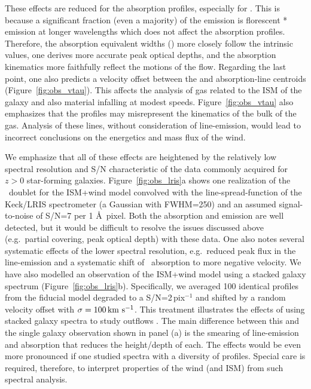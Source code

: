\documentclass[12pt,preprint]{aastex}
\begin{document}
These effects %
are reduced
for the  absorption profiles, especially for \feiia.  This
is because a significant fraction (even a majority) of the
 emission is florescent * emission at longer
wavelengths which does not affect the absorption profiles. 
Therefore, the  absorption equivalent widths (\ewabs) more
closely follow the intrinsic values, one derives more accurate peak
optical depths, and the absorption kinematics more faithfully reflect
the motions of the flow.  Regarding the last point, one also
predicts a velocity offset between the  and 
absorption-line centroids (Figure~\ref{fig:obs_vtau}).
This affects the analysis of gas related to the ISM of the galaxy and
also material infalling at modest speeds.  
Figure~\ref{fig:obs_vtau} also emphasizes that
the  profiles may misrepresent the kinematics of the bulk of
the gas.  Analysis of these lines, without consideration of
line-emission, would lead to incorrect conclusions on the energetics
and mass flux of the wind.

We emphasize that all of these effects are heightened by the
relatively low spectral resolution and S/N characteristic of the data
commonly acquired for $z>0$ star-forming galaxies.  Figure~\ref{fig:obs_lris}a
shows one realization of the \mgiid\ doublet for the ISM+wind model
convolved with the line-spread-function of the Keck/LRIS spectrometer
(a Gaussian with FWHM=250\kms) and an assumed signal-to-noise of
S/N=7 per 1 \AA\ pixel.  Both the absorption
and emission are well detected, but it would be
difficult to resolve the issues discussed above (e.g.\ partial
covering, peak optical depth) with these data.  
One also notes several systematic effects of the lower spectral
resolution, e.g.\ reduced peak flux in the line-emission and a
systematic shift of \mgiia\ absorption to more negative velocity.
We have also modelled an observation of the ISM+wind model using
a stacked galaxy spectrum (Figure~\ref{fig:obs_lris}b).
Specifically, we
averaged 100 identical  profiles from the fiducial model
degraded to a S/N=2\,pix$^{-1}$ and shifted by a random velocity
offset with $\sigma = 100\, {\rm km~s^{-1}}$.  
This treatment illustrates the effects of using stacked galaxy 
spectra to study outflows
\citep[e.g.][S10]{wcp+09,rwk+10}.   The main difference %
between this and 
the
single galaxy observation shown in panel (a) is the smearing of
line-emission and absorption that reduces the height/depth of each.
The effects would be even more pronounced if one studied spectra with
a diversity of  profiles.    
Special care is required, therefore, to interpret properties of the wind (and
ISM) from such spectral analysis.
\end{document}
